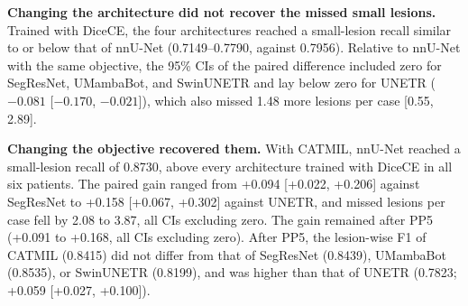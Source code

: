 \begin{table}[t]
\centering
\caption{Small-lesion detection by architecture and objective on the
MSLesSeg test set, without post-processing. All architectures are trained
with the DiceCE objective, except nnU-Net with CATMIL. Values are means
over the test scans and the five fold models. Best values are shown in
\textbf{bold}; second-best values are \underline{underlined}.}
\label{tab:arch_vs_objective}
\end{table}

\textbf{Changing the architecture did not recover the missed small
lesions.} Trained with DiceCE, the four architectures reached a
small-lesion recall similar to or below that of nnU-Net (0.7149--0.7790,
against 0.7956). Relative to nnU-Net with the same objective, the 95\% CIs
of the paired difference included zero for SegResNet, UMambaBot, and
SwinUNETR and lay below zero for UNETR ($-0.081$ [$-0.170$, $-0.021$]),
which also missed 1.48 more lesions per case [0.55, 2.89].

\textbf{Changing the objective recovered them.} With CATMIL, nnU-Net
reached a small-lesion recall of 0.8730, above every architecture trained
with DiceCE in all six patients. The paired gain ranged from +0.094
[+0.022, +0.206] against SegResNet to +0.158 [+0.067, +0.302] against
UNETR, and missed lesions per case fell by 2.08 to 3.87, all CIs excluding
zero. The gain remained after PP5 (+0.091 to +0.168, all CIs excluding
zero). After PP5, the lesion-wise F1 of CATMIL (0.8415) did not differ from
that of SegResNet (0.8439), UMambaBot (0.8535), or SwinUNETR (0.8199), and
was higher than that of UNETR (0.7823; +0.059 [+0.027, +0.100]).

